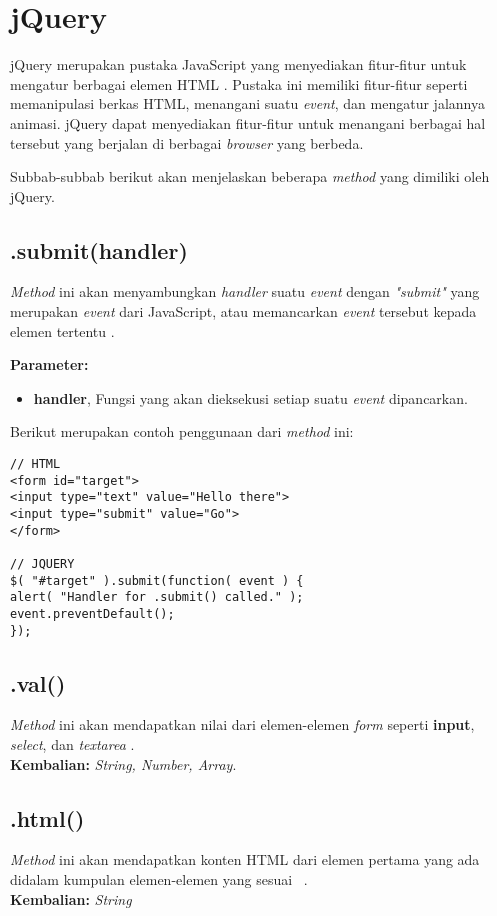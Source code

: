 \section{jQuery}
\label{sec:jQuery}

jQuery merupakan pustaka JavaScript yang menyediakan fitur-fitur untuk mengatur berbagai elemen HTML \cite{mit:06:jquery}. Pustaka ini memiliki fitur-fitur seperti memanipulasi berkas HTML, menangani suatu \textit{event}, dan mengatur jalannya animasi. jQuery dapat menyediakan fitur-fitur untuk menangani berbagai hal tersebut yang berjalan di berbagai \textit{browser} yang berbeda.

Subbab-subbab berikut akan menjelaskan beberapa \textit{method} yang dimiliki oleh jQuery.

\subsection{.submit(handler)}
\textit{Method} ini akan menyambungkan \textit{handler} suatu \textit{event} dengan \textit{"submit"} yang merupakan \textit{event} dari JavaScript, atau memancarkan \textit{event} tersebut kepada elemen tertentu \cite{mit:06:jQueryAPI}. 

\textbf{Parameter:}
\begin{itemize}
	\item \textbf{handler}, Fungsi yang akan dieksekusi setiap suatu \textit{event} dipancarkan.
\end{itemize}

Berikut merupakan contoh penggunaan dari \textit{method} ini:

\begin{lstlisting}
// HTML
<form id="target">
<input type="text" value="Hello there">
<input type="submit" value="Go">
</form>

// JQUERY
$( "#target" ).submit(function( event ) {
alert( "Handler for .submit() called." );
event.preventDefault();
});
\end{lstlisting}

\subsection{.val()}
\textit{Method} ini akan mendapatkan nilai dari elemen-elemen \textit{form} seperti \textbf{input}, \textit{select}, dan \textit{textarea} \cite{mit:06:jQueryAPI}. \\
\textbf{Kembalian:} \textit{String, Number, Array}.

\subsection{.html()}
\textit{Method} ini akan mendapatkan konten HTML dari elemen pertama yang ada didalam kumpulan elemen-elemen yang sesuai ~\cite{mit:06:jQueryAPI}. \\
\textbf{Kembalian:} \textit{String}

